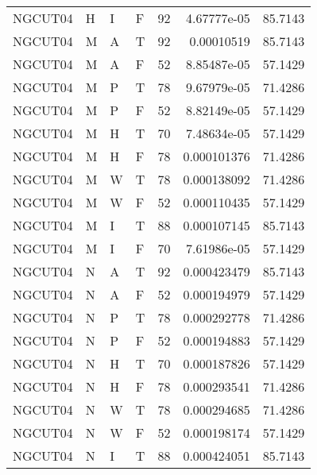 \begin{longtable}{llllrrr}
    NGCUT04  & H         & I         & F          & 92         & 4.67777e-05 & 85.7143  \\
    NGCUT04  & M         & A         & T          & 92         & 0.00010519  & 85.7143  \\
    NGCUT04  & M         & A         & F          & 52         & 8.85487e-05 & 57.1429  \\
    NGCUT04  & M         & P         & T          & 78         & 9.67979e-05 & 71.4286  \\
    NGCUT04  & M         & P         & F          & 52         & 8.82149e-05 & 57.1429  \\
    NGCUT04  & M         & H         & T          & 70         & 7.48634e-05 & 57.1429  \\
    NGCUT04  & M         & H         & F          & 78         & 0.000101376 & 71.4286  \\
    NGCUT04  & M         & W         & T          & 78         & 0.000138092 & 71.4286  \\
    NGCUT04  & M         & W         & F          & 52         & 0.000110435 & 57.1429  \\
    NGCUT04  & M         & I         & T          & 88         & 0.000107145 & 85.7143  \\
    NGCUT04  & M         & I         & F          & 70         & 7.61986e-05 & 57.1429  \\
    NGCUT04  & N         & A         & T          & 92         & 0.000423479 & 85.7143  \\
    NGCUT04  & N         & A         & F          & 52         & 0.000194979 & 57.1429  \\
    NGCUT04  & N         & P         & T          & 78         & 0.000292778 & 71.4286  \\
    NGCUT04  & N         & P         & F          & 52         & 0.000194883 & 57.1429  \\
    NGCUT04  & N         & H         & T          & 70         & 0.000187826 & 57.1429  \\
    NGCUT04  & N         & H         & F          & 78         & 0.000293541 & 71.4286  \\
    NGCUT04  & N         & W         & T          & 78         & 0.000294685 & 71.4286  \\
    NGCUT04  & N         & W         & F          & 52         & 0.000198174 & 57.1429  \\
    NGCUT04  & N         & I         & T          & 88         & 0.000424051 & 85.7143  \\

\end{longtable}
